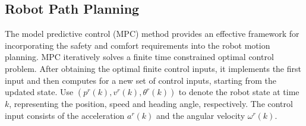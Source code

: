 \documentclass[letterpaper, 10 pt, conference]{ieeeconf}
\newcommand{\todonote}[1]{\vspace{0px} %
	\todo[inline, color=green!30]{\textbf{[Note:]} {#1}} %
}
\begin{document}
	\subsection{Robot Path Planning}\label{subsec:robot_path_plan}
	The model predictive control (MPC) method provides an effective framework for incorporating the safety and comfort requirements into the robot motion planning.
	MPC iteratively solves a finite time constrained optimal control problem.
	After obtaining the optimal finite control inputs, it implements the first input and then computes for a new set of control inputs, starting from the updated state.
	Use $(p^r(k),v^r(k),\theta^r(k))$ to denote the robot state at time $k$, representing the position, speed and heading angle, respectively.
	The control input consists of the acceleration $a^r(k)$ and the angular velocity $\omega^r(k)$.
\end{document}
